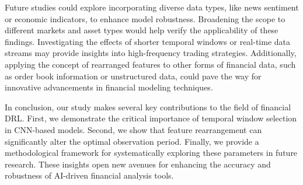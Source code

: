 Future studies could explore incorporating diverse data types, like news sentiment or economic indicators, to enhance model robustness. Broadening the scope to different markets and asset types would help verify the applicability of these findings. Investigating the effects of shorter temporal windows or real-time data streams may provide insights into high-frequency trading strategies. Additionally, applying the concept of rearranged features to other forms of financial data, such as order book information or unstructured data, could pave the way for innovative advancements in financial modeling techniques.

In conclusion, our study makes several key contributions to the field of financial DRL. First, we demonstrate the critical importance of temporal window selection in CNN-based models. Second, we show that feature rearrangement can significantly alter the optimal observation period. Finally, we provide a methodological framework for systematically exploring these parameters in future research. These insights open new avenues for enhancing the accuracy and robustness of AI-driven financial analysis tools.